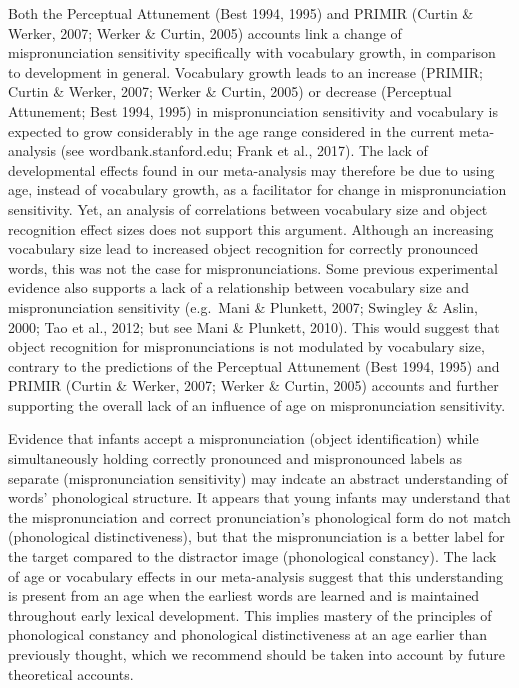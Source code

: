 \documentclass[man]{apa6}
\theoremstyle{definition}
\theoremstyle{definition}
\theoremstyle{definition}
\theoremstyle{remark}
\begin{document}
Both the Perceptual Attunement (Best 1994, 1995) and PRIMIR (Curtin \&
Werker, 2007; Werker \& Curtin, 2005) accounts link a change of
mispronunciation sensitivity specifically with vocabulary growth, in
comparison to development in general. Vocabulary growth leads to an
increase (PRIMIR; Curtin \& Werker, 2007; Werker \& Curtin, 2005) or
decrease (Perceptual Attunement; Best 1994, 1995) in mispronunciation
sensitivity and vocabulary is expected to grow considerably in the age
range considered in the current meta-analysis (see
wordbank.stanford.edu; Frank et al., 2017). The lack of developmental
effects found in our meta-analysis may therefore be due to using age,
instead of vocabulary growth, as a facilitator for change in
mispronunciation sensitivity. Yet, an analysis of correlations between
vocabulary size and object recognition effect sizes does not support
this argument. Although an increasing vocabulary size lead to increased
object recognition for correctly pronounced words, this was not the case
for mispronunciations. Some previous experimental evidence also supports
a lack of a relationship between vocabulary size and mispronunciation
sensitivity (e.g.~Mani \& Plunkett, 2007; Swingley \& Aslin, 2000; Tao
et al., 2012; but see Mani \& Plunkett, 2010). This would suggest that
object recognition for mispronunciations is not modulated by vocabulary
size, contrary to the predictions of the Perceptual Attunement (Best
1994, 1995) and PRIMIR (Curtin \& Werker, 2007; Werker \& Curtin, 2005)
accounts and further supporting the overall lack of an influence of age
on mispronunciation sensitivity.

Evidence that infants accept a mispronunciation (object identification)
while simultaneously holding correctly pronounced and mispronounced
labels as separate (mispronunciation sensitivity) may indcate an
abstract understanding of words' phonological structure. It appears that
young infants may understand that the mispronunciation and correct
pronunciation's phonological form do not match (phonological
distinctiveness), but that the mispronunciation is a better label for
the target compared to the distractor image (phonological constancy).
The lack of age or vocabulary effects in our meta-analysis suggest that
this understanding is present from an age when the earliest words are
learned and is maintained throughout early lexical development. This
implies mastery of the principles of phonological constancy and
phonological distinctiveness at an age earlier than previously thought,
which we recommend should be taken into account by future theoretical
accounts.
\end{document}
